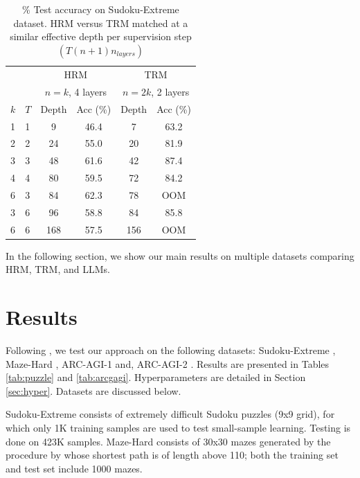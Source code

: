 \documentclass{article}
\newcounter{col}
\theoremstyle{plain}
\theoremstyle{definition}
\theoremstyle{remark}
\begin{document}
\begin{table}[ht]
    \caption{\% Test accuracy on Sudoku-Extreme dataset. HRM versus TRM matched at a similar effective depth per supervision step $(T(n+1)n_{layers})$}
    \centering
    \begin{tabular}{|ll||cc||cc|}
    \hline
      & & \multicolumn{2}{|c||}{HRM} & \multicolumn{2}{|c|}{TRM} \\
      & & \multicolumn{2}{|c||}{$n=k$, 4 layers} & \multicolumn{2}{|c|}{$n=2k$, 2 layers} \\
      \hline
     $k$ & $T$ & Depth & Acc (\%) & Depth & Acc (\%) \\
    \hline
    1 & 1 & 9 & 46.4 & 7 & 63.2 \\ %
    2 & 2 & 24 & 55.0 & 20 & 81.9 \\ %
    3 & 3 & 48 & 61.6 & 42 & 87.4 \\ %
    4 & 4 & 80 & 59.5 & 72 & 84.2 \\ %
    6 & 3 & 84 & 62.3 & 78 & OOM \\ %
    3 & 6 & 96 & 58.8 & 84 & 85.8 \\ %
    6 & 6 & 168 & 57.5 & 156 & OOM \\ %
    \hline
\end{tabular}
\label{tab:ablation_short}
\end{table}

In the following section, we show our main results on multiple datasets comparing HRM, TRM, and LLMs.

\section{Results}

Following \citet{wang2025hierarchical}, we test our approach on the following datasets: Sudoku-Extreme \citep{wang2025hierarchical}, Maze-Hard \citep{wang2025hierarchical}, ARC-AGI-1 \citep{chollet2019measure} and, ARC-AGI-2 \citep{chollet2025arc}. Results are presented in Tables \ref{tab:puzzle} and \ref{tab:arcgagi}. Hyperparameters are detailed in Section \ref{sec:hyper}. Datasets are discussed below.

Sudoku-Extreme consists of extremely difficult Sudoku puzzles \citep{tdoku, palm2018recurrent, sudoku2018} (9x9 grid), for which only 1K training samples are used to test small-sample learning. Testing is done on 423K samples. Maze-Hard consists of 30x30 mazes generated by the procedure by \citet{lehnert2024beyond} whose shortest path is of length above 110; both the training set and test set include 1000 mazes. 
\end{document}
